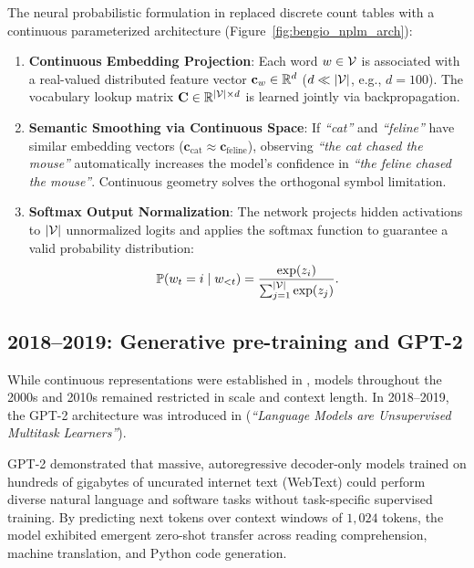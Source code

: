 \documentclass[../../main.tex]{subfiles}
\begin{document}
The neural probabilistic formulation in \cite{bengio2003} replaced discrete count tables with a continuous parameterized architecture (Figure~\ref{fig:bengio_nplm_arch}):
\begin{enumerate}
    \item \textbf{Continuous Embedding Projection}: Each word $w \in \mathcal{V}$ is associated with a real-valued distributed feature vector $\mathbf{c}_w \in \mathbb{R}^d$ ($d \ll |\mathcal{V}|$, e.g., $d = 100$). The vocabulary lookup matrix $\mathbf{C} \in \mathbb{R}^{|\mathcal{V}| \times d}$ is learned jointly via backpropagation.
    \item \textbf{Semantic Smoothing via Continuous Space}: If \textit{``cat''} and \textit{``feline''} have similar embedding vectors ($\mathbf{c}_{\text{cat}} \approx \mathbf{c}_{\text{feline}}$), observing \textit{``the cat chased the mouse''} automatically increases the model's confidence in \textit{``the feline chased the mouse''}. Continuous geometry solves the orthogonal symbol limitation.
    \item \textbf{Softmax Output Normalization}: The network projects hidden activations to $|\mathcal{V}|$ unnormalized logits and applies the softmax function to guarantee a valid probability distribution:
    \begin{equation}
    \label{eq:bengio_softmax}
    \mathbb{P}(w_t = i \mid w_{<t}) = \frac{\exp(z_i)}{\sum_{j=1}^{|\mathcal{V}|} \exp(z_j)}.
    \end{equation}
\end{enumerate}

\subsection{2018--2019: Generative pre-training and GPT-2}
\label{subsec:milestone_gpt2}

While continuous representations were established in \cite{bengio2003}, models throughout the 2000s and 2010s remained restricted in scale and context length. In 2018--2019, the GPT-2 architecture was introduced in \cite{radford2019} (\textit{``Language Models are Unsupervised Multitask Learners''}).

GPT-2 demonstrated that massive, autoregressive decoder-only models trained on hundreds of gigabytes of uncurated internet text (WebText) could perform diverse natural language and software tasks without task-specific supervised training. By predicting next tokens over context windows of $1{,}024$ tokens, the model exhibited emergent zero-shot transfer across reading comprehension, machine translation, and Python code generation.
\end{document}
